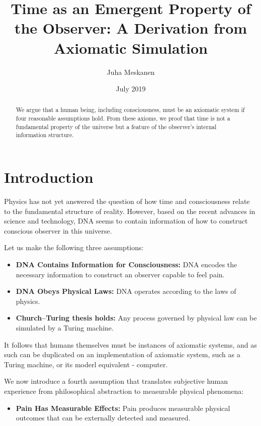 \documentclass[11pt]{article}
\title{Time as an Emergent Property of the Observer: A Derivation from Axiomatic Simulation}
\author{Juha Meskanen}
\date{July 2019}
\begin{document}
\maketitle

\begin{abstract}
  We argue that a human being, including consciousness, must be an axiomatic system if four reasonable
  assumptions hold. From these axioms, we proof that time is not a fundamental property of the universe but a feature of the
  observer's internal information structure.
\end{abstract}

\section{Introduction}

Physics has not yet answered the question of how time and consciousness
relate to the fundamental structure of reality. However, based on the recent advances in science and technology, DNA seems to contain
information of how to construct conscious observer in this universe.

Let us make the following three assumptions:

\begin{itemize}
  \item \textbf{DNA Contains Information for Consciousness:} DNA encodes the necessary information to construct an observer capable to feel pain.
  \item \textbf{DNA Obeys Physical Laws:} DNA operates according to the laws of physics.
  \item  \textbf{Church--Turing thesis holds:}  Any process governed by physical law can be simulated by a Turing machine.
\end{itemize}

It follows that humans themselves must be instances of axiomatic systems, and as such can be duplicated on an implementation
of axiomatic system, such as a Turing machine, or its moderl equivalent - computer.


We now introduce a fourth assumption that translates subjective human experience from philosophical abstraction to measurable physical phenomena:

\begin{itemize}
  \item \textbf{Pain Has Measurable Effects:} Pain produces measurable physical outcomes that can be externally detected and measured.
\end{itemize}
\end{document}
